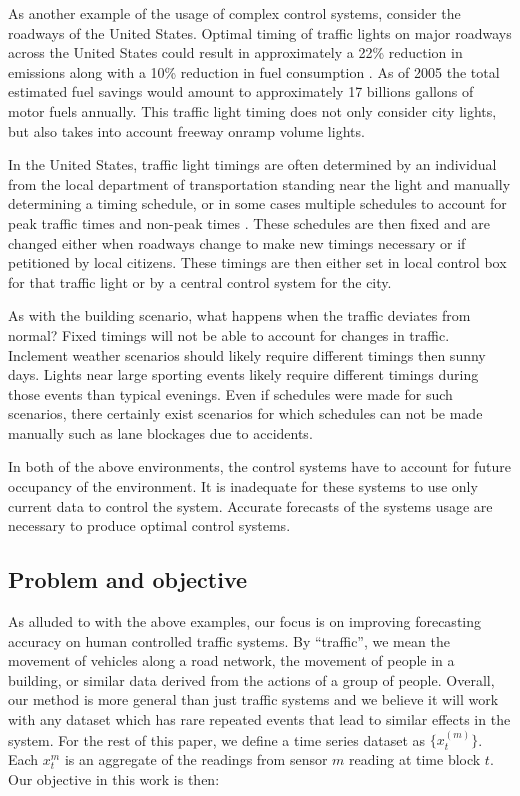 As another example of the usage of complex control systems, consider the roadways of the United States.  Optimal timing of traffic lights on major roadways across the United States could result in approximately a 22\% reduction in emissions along with a 10\% reduction in fuel consumption \cite{DOT2007}.  As of 2005 the total estimated fuel savings would amount to approximately 17 billions gallons of motor fuels annually.  This traffic light timing does not only consider city lights, but also takes into account freeway onramp volume lights.

In the United States, traffic light timings are often determined by an individual from the local department of transportation standing near the light and manually determining a timing schedule, or in some cases multiple schedules to account for peak traffic times and non-peak times \cite{Koonce2008}.  These schedules are then fixed and are changed either when roadways change to make new timings necessary or if petitioned by local citizens.  These timings are then either set in local control box for that traffic light or by a central control system for the city.  

As with the building scenario, what happens when the traffic deviates from normal?  Fixed timings will not be able to account for changes in traffic.  Inclement weather scenarios should likely require different timings then sunny days.  Lights near large sporting events likely require different timings during those events than typical evenings.  Even if schedules were made for such scenarios, there certainly exist scenarios for which schedules can not be made manually such as lane blockages due to accidents. 

In both of the above environments, the control systems have to account for future occupancy of the environment.  It is inadequate for these systems to use only current data to control the system.  Accurate forecasts of the systems usage are necessary to produce optimal control systems.  

\subsection{Problem and objective}
As alluded to with the above examples, our focus is on improving forecasting accuracy on human controlled traffic systems.  By “traffic”, we mean the movement of vehicles along a road network, the movement of people in a building, or similar data derived from the actions of a group of people.  Overall, our method is more general than just traffic systems and we believe it will work with any dataset which has rare repeated events that lead to similar effects in the system.  For the rest of this paper, we define a time series dataset as $\{x_{t}^{(m)}\}$.  Each $x_{t}^{m}$ is an aggregate of the readings from sensor $m$ reading at time block $t$.  Our objective in this work is then:


